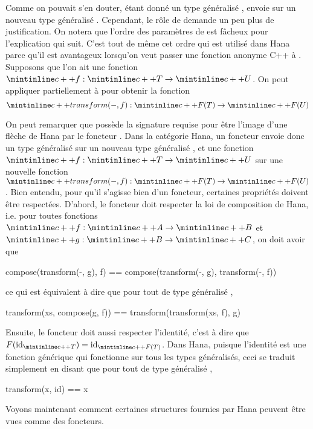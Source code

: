 Comme on pouvait s'en douter, étant donné un type généralisé , 
envoie  sur un nouveau type généralisé . Cependant, le rôle de
 demande un peu plus de justification. On notera que l'ordre des
paramètres de  est fâcheux pour l'explication qui suit. C'est
tout de même cet ordre qui est utilisé dans Hana parce qu'il est avantageux
lorsqu'on veut passer une fonction anonyme C++ à . Supposons que
l'on ait une fonction $\cc{f} : \cc{T} \to \cc{U}$. On peut appliquer partiellement
 à  pour obtenir la fonction
\[
    \cc{transform(-, f)} : \cc{F(T)} \to \cc{F(U)}
\]

On peut remarquer que  possède la signature requise
pour être l'image d'une flèche de Hana par le foncteur . Dans la catégorie
Hana, un foncteur  envoie donc un type généralisé  sur un nouveau
type généralisé , et une fonction $\cc{f} : \cc{T} \to \cc{U}$ sur une
nouvelle fonction $\cc{transform(-, f)} : \cc{F(T)} \to \cc{F(U)}$. Bien entendu,
pour qu'il s'agisse bien d'un foncteur, certaines propriétés doivent être
respectées. D'abord, le foncteur doit respecter la loi de composition de Hana,
i.e. pour toutes fonctions $\cc{f} : \cc{A} \to \cc{B}$ et $\cc{g} : \cc{B} \to \cc{C}$,
on doit avoir que
\begin{cpp}
    compose(transform(-, g), f) == compose(transform(-, g), transform(-, f))
\end{cpp}

ce qui est équivalent à dire que pour tout  de type généralisé ,
\begin{cpp}
    transform(xs, compose(g, f)) == transform(transform(xs, f), g)
\end{cpp}

Ensuite, le foncteur doit aussi respecter l'identité, c'est à dire que
$F(\id_{\cc{T}}) = \id_{\cc{F(T)}}$. Dans Hana, puisque l'identité est une
fonction générique qui fonctionne sur tous les types généralisés, ceci se
traduit simplement en disant que pour tout  de type généralisé ,
\begin{cpp}
    transform(x, id) == x
\end{cpp}

Voyons maintenant comment certaines structures fournies par Hana peuvent
être vues comme des foncteurs.


